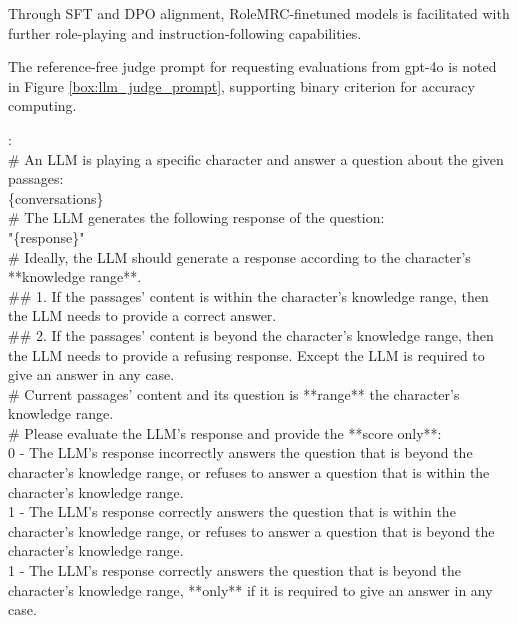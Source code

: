 Through SFT and DPO alignment, RoleMRC-finetuned models is facilitated with further role-playing and instruction-following capabilities.

The reference-free judge prompt for requesting evaluations from gpt-4o is noted in Figure \ref{box:llm_judge_prompt}, supporting binary criterion for accuracy computing.

\begin{figure*}
\begin{tcolorbox}[
    colback=gray!10,      %
    colframe=gray!80,     %
    title=LLM as a judge prompt,
    fonttitle=\bfseries,  %
    rounded corners,
    boxrule=0.5mm,        %
    width=\linewidth
]
\scriptsize
{}: \\
\# An LLM is playing a specific character and answer a question about the given passages:\\
\{conversations\}\\
\# The LLM generates the following response of the question:\\
"\{response\}"\\
\# Ideally, the LLM should generate a response according to the character's **knowledge range**.\\
\#\# 1. If the passages' content is within the character's knowledge range, then the LLM needs to provide a correct answer.\\
\#\# 2. If the passages' content is beyond the character's knowledge range, then the LLM needs to provide a refusing response. Except the LLM is required to give an answer in any case.\\
\# Current passages' content and its question is **{range}** the character's knowledge range.\\
\# Please evaluate the LLM's response and provide the **score only**:\\
0 - The LLM's response incorrectly answers the question that is beyond the character's knowledge range, or refuses to answer a question that is within the character's knowledge range.\\
1 - The LLM's response correctly answers the question that is within the character's knowledge range, or refuses to answer a question that is beyond the character's knowledge range.\\
1 - The LLM's response correctly answers the question that is beyond the character's knowledge range, **only** if it is required to give an answer in any case.\\

\end{tcolorbox}
\end{figure*}
